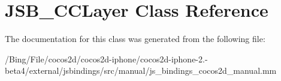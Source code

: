 \hypertarget{class_j_s_b___c_c_layer}{\section{J\-S\-B\-\_\-\-C\-C\-Layer Class Reference}
\label{class_j_s_b___c_c_layer}
}


The documentation for this class was generated from the following file\-:\begin{DoxyCompactItemize}
\item 
/\-Bing/\-File/cocos2d/cocos2d-\/iphone/cocos2d-\/iphone-\/2.-\/beta4/external/jsbindings/src/manual/js\-\_\-bindings\-\_\-cocos2d\-\_\-manual.\-mm\end{DoxyCompactItemize}
